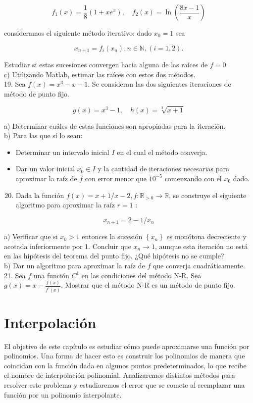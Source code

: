 \documentclass[10pt]{book}
\begin{document}
$$
f_{1}(x)=\frac{1}{8}\left(1+x e^{x}\right), \quad f_{2}(x)=\ln \left(\frac{8 x-1}{x}\right)
$$

consideramos el siguiente método iterativo: dado $x_{0}=1$ sea

$$
x_{n+1}=f_{i}\left(x_{n}\right), n \in \mathbb{N},(i=1,2) .
$$

Estudiar si estas sucesiones convergen hacia alguna de las raíces de $f=0$.\\
c) Utilizando Matlab, estimar las raíces con estos dos métodos.\\
19. Sea $f(x)=x^{3}-x-1$. Se consideran las dos siguientes iteraciones de método de punto fijo.

$$
g(x)=x^{3}-1, \quad h(x)=\sqrt[3]{x+1}
$$

a) Determinar cuáles de estas funciones son apropiadas para la iteración.\\
b) Para las que sí lo sean:

\begin{itemize}
  \item Determinar un intervalo inicial $I$ en el cual el método converja.
  \item Dar un valor inicial $x_{0} \in I$ y la cantidad de iteraciones necesarias para aproximar la raíz de $f$ con error menor que $10^{-5}$ comenzando con el $x_{0}$ dado.
\end{itemize}

\begin{enumerate}
  \setcounter{enumi}{19}
  \item Dada la función $f(x)=x+1 / x-2, f: \mathbb{R}_{>0} \rightarrow \mathbb{R}$, se construye el siguiente algoritmo para aproximar la raíz $r=1$ :
\end{enumerate}

$$
x_{n+1}=2-1 / x_{n}
$$

a) Verificar que si $x_{0}>1$ entonces la sucesión $\left\{x_{n}\right\}$ es monótona decreciente y acotada inferiormente por 1. Concluir que $x_{n} \rightarrow 1$, aunque esta iteración no está en las hipótesis del teorema del punto fijo. ¿Qué hipótesis no se cumple?\\
b) Dar un algoritmo para aproximar la raíz de $f$ que converja cuadráticamente.\\
21. Sea $f$ una función $C^{1}$ en las condiciones del método N-R. Sea $g(x)=x-\frac{f(x)}{f^{\prime}(x)}$. Mostrar que el método N-R es un método de punto fijo.

\chapter{Interpolación}
El objetivo de este capítulo es estudiar cómo puede aproximarse una función por polinomios. Una forma de hacer esto es construir los polinomios de manera que coincidan con la función dada en algunos puntos predeterminados, lo que recibe el nombre de interpolación polinomial. Analizaremos distintos métodos para resolver este problema y estudiaremos el error que se comete al reemplazar una función por un polinomio interpolante.
\end{document}
